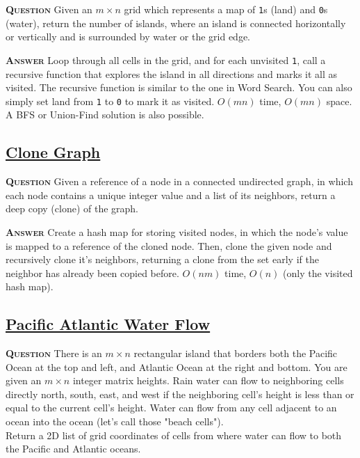 \documentclass[table, xcdraw]{article}%
\begin{document}
\textsc{\textbf{Question}} Given an $m \times n$ grid which represents a map of \texttt{1}s (land) and \texttt{0}s (water), return the number of islands, where an island is connected horizontally or vertically and is surrounded by water or the grid edge.

\textsc{\textbf{Answer}} Loop through all cells in the grid, and for each unvisited \texttt{1}, call a recursive function that explores the island in all directions and marks it all as visited. The recursive function is similar to the one in Word Search. You can also simply set land from \texttt{1} to \texttt{0} to mark it as visited. $O(mn)$ time, $O(mn)$ space. A BFS or Union-Find solution is also possible.

\subsection{\href{https://leetcode.com/problems/clone-graph}{Clone Graph}}

\textsc{\textbf{Question}} Given a reference of a node in a connected undirected graph, in which each node contains a unique integer value and a list of its neighbors, return a deep copy (clone) of the graph.

\textsc{\textbf{Answer}} Create a hash map for storing visited nodes, in which the node's value is mapped to a reference of the cloned node. Then, clone the given node and recursively clone it's neighbors, returning a clone from the set early if the neighbor has already been copied before. $O(nm)$ time, $O(n)$ (only the visited hash map).

\subsection{\href{https://leetcode.com/problems/pacific-atlantic-water-flow}{Pacific Atlantic Water Flow}}

\textsc{\textbf{Question}} There is an $m \times n$ rectangular island that borders both the Pacific Ocean at the top and left, and Atlantic Ocean at the right and bottom. You are given an $m \times n$ integer matrix heights. Rain water can flow to neighboring cells directly north, south, east, and west if the neighboring cell's height is less than or equal to the current cell's height. Water can flow from any cell adjacent to an ocean into the ocean (let's call those "beach cells").\\
Return a 2D list of grid coordinates of cells from where water can flow to both the Pacific and Atlantic oceans.
\end{document}
